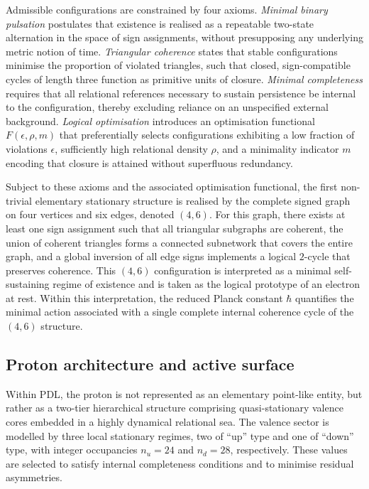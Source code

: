 \documentclass[11pt,a4paper]{article}
\begin{document}
Admissible configurations are constrained by four axioms.\cite{Laubscher2026IntroPDL,Laubscher2026FullPDL}
\emph{Minimal binary pulsation} postulates that existence is realised as a repeatable two-state alternation in the space of sign assignments, without presupposing any underlying metric notion of time.
\emph{Triangular coherence} states that stable configurations minimise the proportion of violated triangles, such that closed, sign-compatible cycles of length three function as primitive units of closure.
\emph{Minimal completeness} requires that all relational references necessary to sustain persistence be internal to the configuration, thereby excluding reliance on an unspecified external background.
\emph{Logical optimisation} introduces an optimisation functional $F(\epsilon,\rho,m)$ that preferentially selects configurations exhibiting a low fraction of violations $\epsilon$, sufficiently high relational density $\rho$, and a minimality indicator $m$ encoding that closure is attained without superfluous redundancy.\cite{Laubscher2026FullPDL}

Subject to these axioms and the associated optimisation functional, the first non-trivial elementary stationary structure is realised by the complete signed graph on four vertices and six edges, denoted $(4,6)$.\cite{Laubscher2026IntroPDL,Laubscher2026FullPDL}
For this graph, there exists at least one sign assignment such that all triangular subgraphs are coherent, the union of coherent triangles forms a connected subnetwork that covers the entire graph, and a global inversion of all edge signs implements a logical $2$-cycle that preserves coherence.
This $(4,6)$ configuration is interpreted as a minimal self-sustaining regime of existence and is taken as the logical prototype of an electron at rest.
Within this interpretation, the reduced Planck constant $\hbar$ quantifies the minimal action associated with a single complete internal coherence cycle of the $(4,6)$ structure.\cite{Laubscher2026FullPDL}

\subsection{Proton architecture and active surface}

Within PDL, the proton is not represented as an elementary point-like entity, but rather as a two-tier hierarchical structure comprising quasi-stationary valence cores embedded in a highly dynamical relational sea.\cite{Laubscher2026FullPDL,Laubscher2026CombinatorialProton}
The valence sector is modelled by three local stationary regimes, two of ``up'' type and one of ``down'' type, with integer occupancies $n_{u}=24$ and $n_{d}=28$, respectively. 
These values are selected to satisfy internal completeness conditions and to minimise residual asymmetries.
\end{document}

